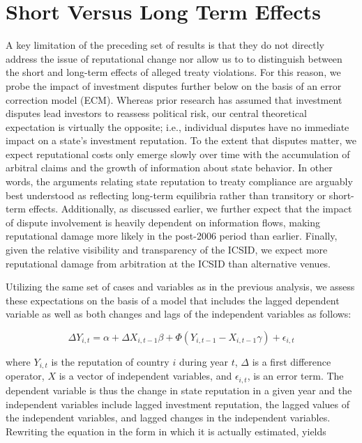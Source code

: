 \documentclass[12pt,onesided]{amsart}
\begin{document}
\section*{Short Versus Long Term Effects}

A key limitation of the preceding set of results is that they do not directly address the issue of reputational change nor allow us to to distinguish between the short and long-term effects of alleged treaty violations. For this reason, we probe the impact of investment disputes further below on the basis of an error correction model (ECM). Whereas prior research has assumed that investment disputes lead investors to reassess political risk, our central theoretical expectation is virtually the opposite; i.e., individual disputes have no immediate impact on a state's investment reputation. To the extent that disputes matter, we expect reputational costs only emerge slowly over time with the accumulation of arbitral claims and the growth of information about state behavior. In other words, the arguments relating state reputation to treaty compliance are arguably best understood as reflecting long-term equilibria rather than transitory or short-term effects. Additionally, as discussed earlier, we further expect that the impact of dispute involvement is heavily dependent on information flows, making reputational damage more likely in the post-2006 period than earlier. Finally, given the relative visibility and transparency of the ICSID, we expect more reputational damage from arbitration at the ICSID than alternative venues.

Utilizing the same set of cases and variables as in the previous analysis, we assess these expectations on the basis of a model that includes the lagged dependent variable as well as both changes and lags of the independent variables as follows:

\begin{equation}
\Delta Y_{i,t} = \alpha + \Delta X_{i,t-1} \beta + \Phi(Y_{i,t-1} - X_{i,t-1} \gamma) + \epsilon_{i,t}
\end{equation}

where $Y_{i,t}$ is the reputation of country $i$ during year $t$, $\Delta$ is a first difference operator, $X$ is a vector of independent variables, and $\epsilon_{i,t}$, is an error term. The dependent variable is thus the change in state reputation in a given year and the independent variables include lagged investment reputation, the lagged values of the independent variables, and lagged changes in the independent variables. Rewriting the equation in the form in which it is actually estimated, yields
\end{document}
